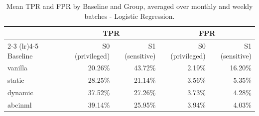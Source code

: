\begin{table}
  \caption{Mean TPR and FPR by Baseline and Group, averaged over monthly and weekly batches - Logistic Regression.}
  \label{tab:absolute-rates-lr-combined}
  \begin{tabular}{lrrrr}
    \toprule
     & \multicolumn{2}{c}{TPR} & \multicolumn{2}{c}{FPR} \\
    \cmidrule(lr){2-3} \cmidrule(lr){4-5}
    Baseline & S0 (privileged) & S1 (sensitive) & S0 (privileged) & S1 (sensitive) \\
    \midrule
    vanilla & 20.26\% & 43.72\% & 2.19\% & 16.20\% \\
    static & 28.25\% & 21.14\% & 3.56\% & 5.35\% \\
    dynamic & 37.52\% & 27.26\% & 3.73\% & 4.28\% \\
    abcinml & 39.14\% & 25.95\% & 3.94\% & 4.03\% \\
    \bottomrule
  \end{tabular}
\end{table}
